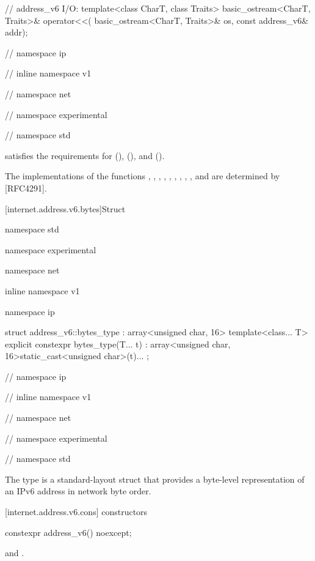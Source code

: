 \begin{codeblock}
{{{{{  // address_v6 I/O:
  template<class CharT, class Traits>
    basic_ostream<CharT, Traits>& operator<<(
      basic_ostream<CharT, Traits>& os, const address_v6& addr);

} // namespace ip
} // inline namespace v1
} // namespace net
} // namespace experimental
} // namespace std
\end{codeblock}

\pnum
{} satisfies the requirements for  (),  (), and  ().

\pnum
\begin{note} The implementations of the functions , , , , , , , , ,  and  are determined by [RFC4291]. \end{note}


[internet.address.v6.bytes]{Struct }

%
\begin{codeblock}
namespace std {
namespace experimental {
namespace net {
inline namespace v1 {
namespace ip {

  struct address_v6::bytes_type : array<unsigned char, 16>
  {
    template<class... T> explicit constexpr bytes_type(T... t)
      : array<unsigned char, 16>{{static_cast<unsigned char>(t)...}} {}
  };

} // namespace ip
} // inline namespace v1
} // namespace net
} // namespace experimental
} // namespace std
\end{codeblock}

\pnum
The  type is a standard-layout struct that provides a byte-level representation of an IPv6 address in network byte order.



%
[internet.address.v6.cons]{ constructors}

\begin{itemdecl}
constexpr address_v6() noexcept;
\end{itemdecl}

\begin{itemdescr}
\pnum
\postconditions {} and .
\end{itemdescr}

